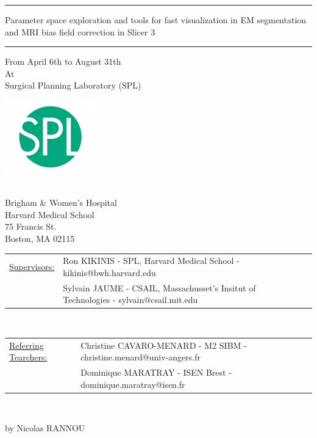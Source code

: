\documentclass[a4paper,11pt]{report}
\begin{document}
\begin{titlepage}
\begin{center}
\bigskip
\bigskip
\bigskip

\hrule
\bigskip
\begin{minipage}{1\textwidth}
\begin{center}\begin{LARGE} Parameter space exploration and tools for fast visualization in EM segmentation and MRI bias field correction in Slicer 3
\end{LARGE}\end{center}
\end{minipage}
\bigskip
\hrule

\bigskip
\bigskip
\bigskip

\begin{small}From April 6th to August 31th \\ 
At \\ 
Surgical Planning Laboratory (SPL)
\end{small}

\includegraphics[width=.3\textwidth]{Images/Logos/logo_spl.jpg}
\begin{small}\\Brigham \& Women's Hospital\\
 Harvard Medical School \\
 75 Francis St. \\
 Boston, MA 02115\end{small}
\end{center}
\vspace{0.5cm}
\begin{tabular}{*{2}ll}
\underline{Supervisors:} &Ron KIKINIS - SPL, Harvard Medical School - kikinis@bwh.harvard.edu\\
&Sylvain JAUME - CSAIL, Massachusset's Insitut of Technologies - sylvain@csail.mit.edu\\
\end{tabular}
\vspace{0.5cm}\\
\begin{tabular}{*{2}l}
\underline{Referring Tearchers:} &Christine CAVARO-MENARD - M2 SIBM - christine.menard@univ-angers.fr\\
&Dominique MARATRAY - ISEN Brest - dominique.maratray@isen.fr
\end{tabular}
\vspace{0.5cm}\\
\begin{flushright}by Nicolas RANNOU\end{flushright}

\end{titlepage}
\end{document}
